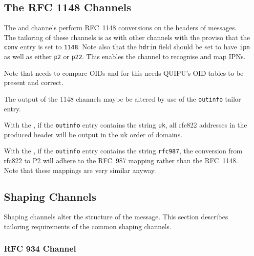 \subsection	{The RFC 1148 Channels}

The  and  channels perform RFC~1148 conversions
on the headers of messages.
The tailoring of these channels is as with other channels with the
proviso that the \verb+conv+ entry is set to \verb+1148+.
Note also that the \verb+hdrin+ field should be set to have
\verb+ipn+ as well as either \verb+p2+ or \verb+p22+.
This enables the  channel to recognise and map IPNs.

Note that  needs to compare OIDs and for this needs
QUIPU's OID tables to be present and correct.

The output of the 1148 channels maybe be altered by use of the
\verb+outinfo+ tailor entry.

With the , if the \verb+outinfo+ entry contains the string
\verb+uk+, all rfc822 addresses in the produced header will be output
in the uk order of domains.

With the , if the \verb+outinfo+ entry contains the string
\verb+rfc987+, the conversion from rfc822 to P2 will adhere to the
RFC~987 mapping rather than the RFC~1148. 
Note that these mappings are very similar anyway.

\subsection 	{Shaping Channels}

Shaping channels alter the structure of the message.
This section describes tailoring requirements of the common shaping
channels. 

\subsubsection	{RFC 934 Channel}

